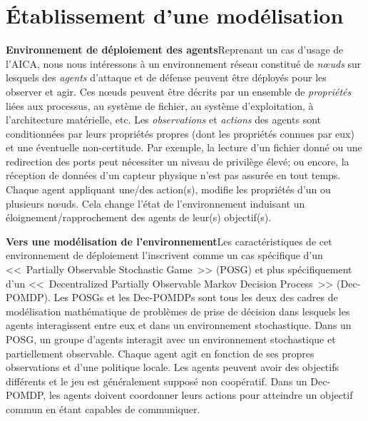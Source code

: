 \section{Établissement d'une modélisation}

\textbf{Environnement de déploiement des agents}\qquad Reprenant un cas d'usage de l'AICA\cite{theron_autonomous_2021}, nous nous intéressons à un environnement réseau constitué de \textit{nœuds} sur lesquels des \textit{agents} d'attaque et de défense peuvent être déployés pour les observer et agir. Ces nœuds peuvent être décrits par un ensemble de \textit{propriétés} liées aux processus, au système de fichier, au système d'exploitation, à l'architecture matérielle, etc.
Les \textit{observations} et \textit{actions} des agents sont conditionnées par leurs propriétés propres (dont les propriétés connues par eux) et une éventuelle non-certitude. Par exemple, la lecture d'un fichier donné ou une redirection des ports peut nécessiter un niveau de privilège élevé; ou encore, la réception de données d'un capteur physique n'est pas assurée en tout temps.
Chaque agent appliquant une/des action(s), modifie les propriétés d'un ou plusieurs nœuds. Cela change l'état de l'environnement induisant un éloignement/rapprochement des agents de leur(s) objectif(s).

\textbf{Vers une modélisation de l'environnement}\quad Les caractéristiques de cet environnement de déploiement l'inscrivent comme un cas spécifique d'un <<~Partially Observable Stochastic Game~>> (POSG) et plus spécifiquement d'un <<~Decentralized Partially Observable Markov Decision Process~>> (Dec-POMDP).
Les POSGs et les Dec-POMDPs sont tous les deux des cadres de modélisation mathématique de problèmes de prise de décision dans lesquels les agents interagissent entre eux et dans un environnement stochastique\cite{beynier2010}. Dans un POSG, un groupe d'agents interagit avec un environnement stochastique et partiellement observable. Chaque agent agit en fonction de ses propres observations et d'une politique locale. Les agents peuvent avoir des objectifs différents et le jeu est généralement supposé non coopératif\cite{jk2020}.
Dans un Dec-POMDP, les agents doivent coordonner leurs actions pour atteindre un objectif commun en étant capables de communiquer\cite{bernstein2013}.

\ 

